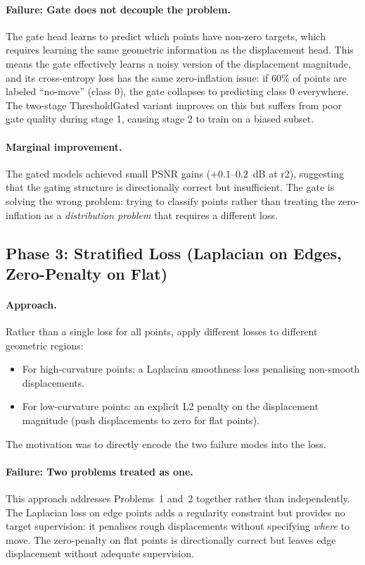 \paragraph{Failure: Gate does not decouple the problem.}
The gate head learns to predict which points have non-zero targets, which
requires learning the same geometric information as the displacement head.
This means the gate effectively learns a noisy version of the displacement
magnitude, and its cross-entropy loss has the same zero-inflation issue:
if 60\% of points are labeled ``no-move'' (class 0), the gate collapses to
predicting class 0 everywhere.
The two-stage ThresholdGated variant improves on this but suffers from poor
gate quality during stage 1, causing stage 2 to train on a biased subset.

\paragraph{Marginal improvement.}
The gated models achieved small PSNR gains ($+0.1$--$0.2$~dB at r2), suggesting
that the gating structure is directionally correct but insufficient.
The gate is solving the wrong problem: trying to classify points
rather than treating the zero-inflation as a \emph{distribution problem}
that requires a different loss.

\subsection{Phase 3: Stratified Loss (Laplacian on Edges, Zero-Penalty on Flat)}

\paragraph{Approach.}
Rather than a single loss for all points, apply different losses to different
geometric regions:
\begin{itemize}
  \item For high-curvature points: a Laplacian smoothness loss penalising
    non-smooth displacements.
  \item For low-curvature points: an explicit L2 penalty on the displacement
    magnitude (push displacements to zero for flat points).
\end{itemize}

The motivation was to directly encode the two failure modes into the loss.

\paragraph{Failure: Two problems treated as one.}
This approach addresses Problems~1 and~2 together rather than independently.
The Laplacian loss on edge points adds a regularity constraint but provides no
target supervision: it penalises rough displacements without specifying
\emph{where} to move.
The zero-penalty on flat points is directionally correct but leaves edge
displacement without adequate supervision.

